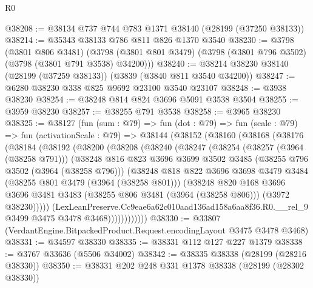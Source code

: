 \begin{lexlean}{R0}
\begin{coremodule}
@38208 := @38134 @737 @744 @783 @1371 @38140 (@28199 (@37250 @38133))
@38214 := @35343 @38133 @786 @811 @826 @1370 @3540
@38230 := @3798
    (@3801 @806 @3481)
    (@3798 (@3801 @801 @3479) (@3798 (@3801 @796 @3502) (@3798 (@3801 @791 @3538) @34200)))
@38240 := @38214 @38230 @38140 (@28199 (@37259 @38133)) (@3839 (@3840 @811 @3540 @34200))
@38247 := @6280 @38230 @338 @825 @9692 @23100 @3540 @23107
@38248 := @3938 @38230
@38254 := @38248 @814 @824 @3696 @5091 @3538 @3504
@38255 := @3959 @38230
@38257 := @38255 @791 @3538
@38258 := @3965 @38230
@38325 := @38127
    (fun (sum : @79) =>
    fun (dot : @79) =>
    fun (scale : @79) =>
    fun (activationScale : @79) =>
    @38144
      (@38152
        (@38160
          (@38168
            (@38176
              (@38184
                (@38192
                  (@38200
                    (@38208
                      (@38240
                        (@38247
                          (@38254
                            (@38257 (@3964 (@38258 @791)))
                            (@38248
                              @816
                              @823
                              @3696
                              @3699
                              @3502
                              @3485
                              (@38255 @796 @3502 (@3964 (@38258 @796)))
                              (@38248
                                @818
                                @822
                                @3696
                                @3698
                                @3479
                                @3484
                                (@38255 @801 @3479 (@3964 (@38258 @801)))
                                (@38248
                                  @820
                                  @168
                                  @3696
                                  @3696
                                  @3481
                                  @3483
                                  (@38255 @806 @3481 (@3964 (@38258 @806)))
                                  (@3972 @38230)))))
                          (LexLeanPreserve.Cc9eae6a62c010aad136ad158a6aa8f36.R0.__rel_9
                            @3499
                            @3475
                            @3478
                            @3468))))))))))))
@38330 := @33807 (VerdantEngine.BitpackedProduct.Request.encodingLayout @3475 @3478 @3468)
@38331 := @34597 @38330
@38335 := @38331 @112 @127 @227 @1379
@38338 := @3767 @33636 (@5506 @34002)
@38342 := @38335 @38338 (@28199 (@28216 @38330))
@38350 := @38331 @202 @248 @331 @1378 @38338 (@28199 (@28302 @38330))

\end{coremodule}
\end{lexlean}
